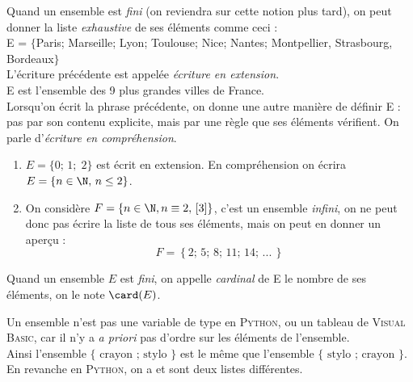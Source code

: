 \documentclass[a4paper,12pt,french]{book}
\begin{document}
\begin{definition}

Quand un ensemble est \textit{fini} (on reviendra sur cette notion plus tard), on peut donner la liste \textit{exhaustive} de ses éléments comme ceci :\\

E = $\{$Paris; Marseille; Lyon; Toulouse; Nice; Nantes; Montpellier, Strasbourg, Bordeaux$\}$\\
L'écriture précédente est appelée \textit{écriture en extension}.\\

\og E est l'ensemble des 9 plus grandes villes de France.\fg{}\\
Lorsqu'on écrit la phrase précédente, on donne une autre manière de définir E : pas par son contenu explicite, mais par une règle que ses éléments vérifient. On parle d'\textit{écriture en compréhension}.
\end{definition}

\begin{exemple}[s]
\begin{enumerate}[--]
	\item 	$E=\{0;\,1;\;2\}$ est écrit en extension. En compréhension on écrira $E=\{n\in\N,\,n\leq 2\}$.
	\item 	On considère $F=\{n\in\N, n\equiv 2,\,[3]\}$, c'est un ensemble \textit{infini}, on ne peut donc pas écrire la liste de tous ses éléments, mais on peut en donner un \og aperçu\fg{} :
	$$F=\left\{2;\,5;\,8;\,11;\,14;\,...\,\right\}$$
\end{enumerate}
\end{exemple}

\begin{definition}[]
Quand un ensemble $E$ est \textit{fini}, on appelle \textit{cardinal} de E le nombre de ses éléments, on le note $\card(E)$.
\end{definition}

\begin{remarque}[]
Un ensemble n'est pas une variable de type  en \textsc{Python}, ou un tableau de \textsc{Visual Basic}, car il n'y a \textit{a priori} pas d'ordre sur les éléments de l'ensemble.\\
Ainsi l'ensemble $\{\text{ crayon ; stylo }\}$ est le même que l'ensemble $\{\text{ stylo ; crayon }\}$.\\
En revanche en \textsc{Python}, on a  et  sont deux listes différentes.


\end{remarque}
\end{document}
